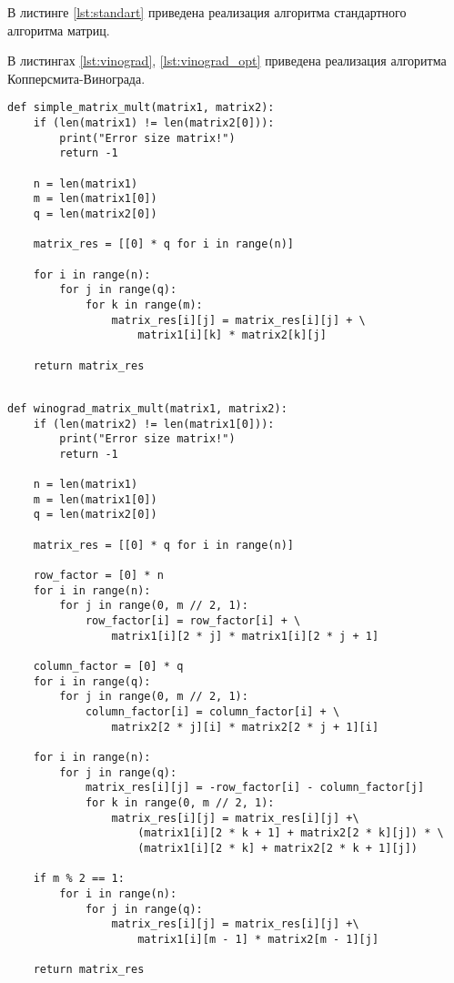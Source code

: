 В листинге \ref{lst:standart} приведена реализация алгоритма стандартного алгоритма матриц.

В листингах \ref{lst:vinograd}, \ref{lst:vinograd_opt} приведена реализация алгоритма Копперсмита-Винограда.


\begin{lstlisting}[label=lst:standart,caption=Реализация стандарного умножения матриц]
def simple_matrix_mult(matrix1, matrix2):
	if (len(matrix1) != len(matrix2[0])):
		print("Error size matrix!")
		return -1
	
	n = len(matrix1)
	m = len(matrix1[0])
	q = len(matrix2[0])
	
	matrix_res = [[0] * q for i in range(n)]
	
	for i in range(n):
		for j in range(q):
			for k in range(m):
				matrix_res[i][j] = matrix_res[i][j] + \
					matrix1[i][k] * matrix2[k][j]
				
	return matrix_res
	
\end{lstlisting}

\begin{lstlisting}[label=lst:vinograd,caption=Реализация алгоритма Копперсмита-Винограда]
def winograd_matrix_mult(matrix1, matrix2):
	if (len(matrix2) != len(matrix1[0])):
		print("Error size matrix!")
		return -1
	
	n = len(matrix1)
	m = len(matrix1[0])
	q = len(matrix2[0])
	
	matrix_res = [[0] * q for i in range(n)]
	
	row_factor = [0] * n
	for i in range(n):
		for j in range(0, m // 2, 1):
			row_factor[i] = row_factor[i] + \
				matrix1[i][2 * j] * matrix1[i][2 * j + 1]
	
	column_factor = [0] * q
	for i in range(q):
		for j in range(0, m // 2, 1):
			column_factor[i] = column_factor[i] + \
				matrix2[2 * j][i] * matrix2[2 * j + 1][i]
	
	for i in range(n):
		for j in range(q):
			matrix_res[i][j] = -row_factor[i] - column_factor[j]
			for k in range(0, m // 2, 1):
				matrix_res[i][j] = matrix_res[i][j] +\
					(matrix1[i][2 * k + 1] + matrix2[2 * k][j]) * \
					(matrix1[i][2 * k] + matrix2[2 * k + 1][j])
	
	if m % 2 == 1:
		for i in range(n):
			for j in range(q):
				matrix_res[i][j] = matrix_res[i][j] +\
					matrix1[i][m - 1] * matrix2[m - 1][j]
	
	return matrix_res
\end{lstlisting}

